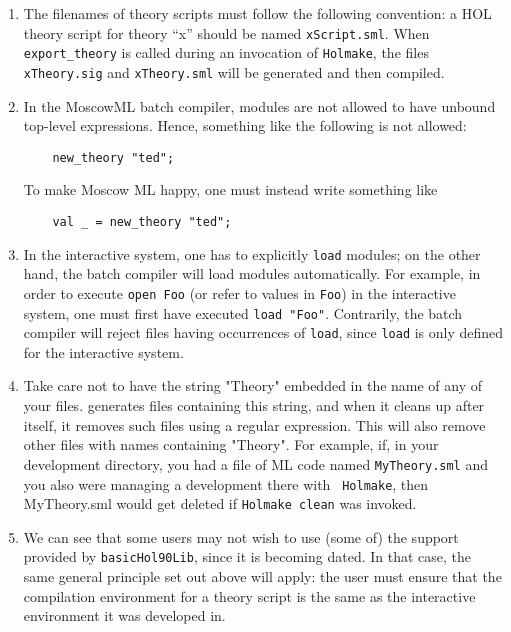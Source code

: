 \begin{enumerate}
\item The filenames of theory scripts must follow the following
  convention: a HOL theory script for theory ``x'' should be named
  \texttt{xScript.sml}.  When \verb+export_theory+ is called during an
  invocation of \verb+Holmake+, the files \texttt{xTheory.sig} and
  \texttt{xTheory.sml} will be generated and then compiled.

\item In the MoscowML batch compiler, modules are not allowed to have
  unbound top-level expressions. Hence, something like the following
  is not allowed:
\begin{verbatim}
    new_theory "ted";
\end{verbatim}
To make Moscow ML happy, one must instead write something like
\begin{verbatim}
    val _ = new_theory "ted";
\end{verbatim}

\item In the interactive system, one has to explicitly \verb+load+
  modules; on the other hand, the batch compiler will load modules
  automatically.  For example, in order to execute \verb+open Foo+ (or
  refer to values in \verb+Foo+) in the interactive system, one must
  first have executed \verb+load "Foo"+. Contrarily, the batch
  compiler will reject files having occurrences of \verb+load+, since
  \verb+load+ is only defined for the interactive system.

\item Take care not to have the string "Theory" embedded in the name
  of any of your files. \holn{} generates files containing this
  string, and when it cleans up after itself, it removes such files
  using a regular expression. This will also remove other files with
  names containing "Theory". For example, if, in your development
  directory, you had a file of ML code named \texttt{MyTheory.sml} and
  you also were managing a \holn{} development there with {\tt
    Holmake}, then MyTheory.sml would get deleted if {\tt Holmake
    clean} was invoked.

\item We can see that some users may not wish to use (some of) the
  support provided by \verb+basicHol90Lib+, since it is becoming
  dated. In that case, the same general principle set out above will
  apply: the user must ensure that the compilation environment for a
  theory script is the same as the interactive environment it was
  developed in.

\end{enumerate}

